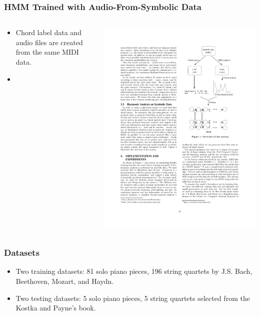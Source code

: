 \documentclass{beamer}
\begin{document}
\begin{frame}
  \frametitle{HMM Trained with Audio-From-Symbolic Data}
  \begin{columns}
	\begin{column}{.6\textwidth}
	\begin{itemize}
		\item Chord label data and audio files are created from the same MIDI data.
		\item 
	\end{itemize}
	\end{column}
	\begin{column}{.4\textwidth}
  \includegraphics[height=.85\textheight]{fig1.pdf}
  	\end{column}
  	\end{columns}
\end{frame} 

\begin{frame}
	\frametitle{Datasets}
	\begin{itemize}
		\item Two training datasets: 81 solo piano pieces, 196 string quartets by J.S. Bach, Beethoven, Mozart, and Haydn.
		\item Two testing datasets: 5 solo piano pieces, 5 string quartets selected from the Kostka and Payne's book.
	\end{itemize}
	
\end{frame}  
\end{document}
